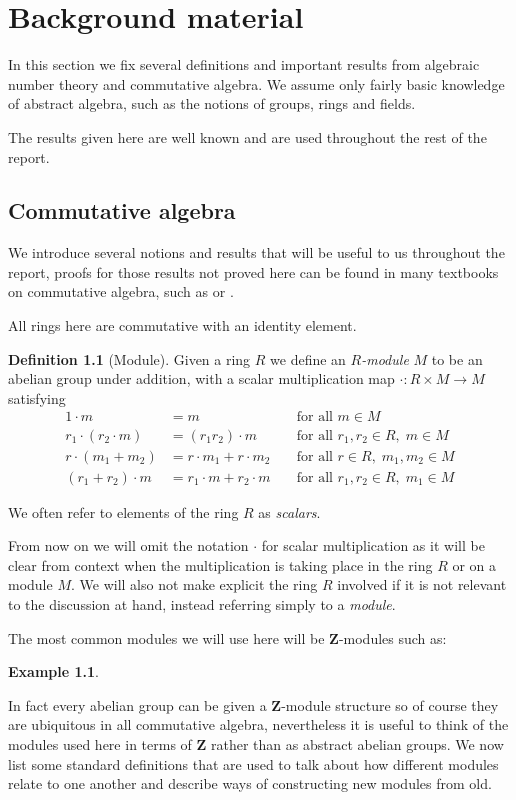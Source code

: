 \documentclass[a4paper,abstracton,bibtotoc]{scrreprt}
\theoremstyle{definition}
\newtheorem{defn}{Definition}
\newtheorem{ex}{Example}
\newcommand{\ZZ}{\mathbf{Z}}
\begin{document}
\chapter{Background material}
\label{chap:background}

In this section we fix several definitions and important results from algebraic number theory and commutative algebra.
We assume only fairly basic knowledge of abstract algebra, such as the notions of groups, rings and fields.

The results given here are well known and are used throughout the rest of the report.

\section{Commutative algebra}
\label{sec:ca}
We introduce several notions and results that will be useful to us throughout the report, proofs for those results not proved here can be found in many textbooks on commutative algebra, such as \cite{am} or \cite{matsumura}.

All rings here are commutative with an identity element.
\begin{defn}[Module]
Given a ring $R$ we define an \emph{$R$-module} $M$ to be an abelian group under addition, with a scalar multiplication map $\cdot \colon R\times M \to M$ satisfying
\begin{align*}
1\cdot m &= m \; &&\text{for all } m\in M \\
r_1\cdot(r_2 \cdot m) &= (r_1r_2)\cdot m \; &&\text{for all } r_1,r_2\in R,\; m\in M \\
r\cdot(m_1 + m_2) &= r\cdot m_1 + r\cdot m_2 \; &&\text{for all } r\in R, \; m_1,m_2\in M \\
(r_1 + r_2)\cdot m &= r_1\cdot m + r_2\cdot m \; &&\text{for all } r_1,r_2\in R, \; m_1\in M
\end{align*}
\end{defn}

We often refer to elements of the ring $R$ as \emph{scalars}.

From now on we will omit the notation $\cdot$ for scalar multiplication as it will be clear from context when the multiplication is taking place in the ring $R$ or on a module $M$.
We will also not make explicit the ring $R$ involved if it is not relevant to the discussion at hand, instead referring simply to a \emph{module}.

The most common modules we will use here will be $\ZZ$-modules such as:
\begin{ex}

\end{ex}
In fact every abelian group can be given a $\ZZ$-module structure so of course they are ubiquitous in all commutative algebra, nevertheless it is useful to think of the modules used here in terms of $\ZZ$ rather than as abstract abelian groups.
We now list some standard definitions that are used to talk about how different modules relate to one another and describe ways of constructing new modules from old.
\end{document}
